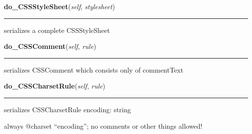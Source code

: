     \vspace{0.5ex}

\hspace{.8\funcindent}\begin{boxedminipage}{\funcwidth}

    \raggedright \textbf{do\_CSSStyleSheet}(\textit{self}, \textit{stylesheet})

    \vspace{-1.5ex}

    \rule{\textwidth}{0.5\fboxrule}
\setlength{\parskip}{2ex}

serializes a complete CSSStyleSheet
\setlength{\parskip}{1ex}
    \end{boxedminipage}

    \label{cssutils:serialize:CSSSerializer:do_CSSComment}

    \vspace{0.5ex}

\hspace{.8\funcindent}\begin{boxedminipage}{\funcwidth}

    \raggedright \textbf{do\_CSSComment}(\textit{self}, \textit{rule})

    \vspace{-1.5ex}

    \rule{\textwidth}{0.5\fboxrule}
\setlength{\parskip}{2ex}

serializes CSSComment which consists only of commentText
\setlength{\parskip}{1ex}
    \end{boxedminipage}

    \label{cssutils:serialize:CSSSerializer:do_CSSCharsetRule}

    \vspace{0.5ex}

\hspace{.8\funcindent}\begin{boxedminipage}{\funcwidth}

    \raggedright \textbf{do\_CSSCharsetRule}(\textit{self}, \textit{rule})

    \vspace{-1.5ex}

    \rule{\textwidth}{0.5\fboxrule}
\setlength{\parskip}{2ex}

serializes CSSCharsetRule
encoding: string

always @charset ``encoding'';
no comments or other things allowed!
\setlength{\parskip}{1ex}
    \end{boxedminipage}

